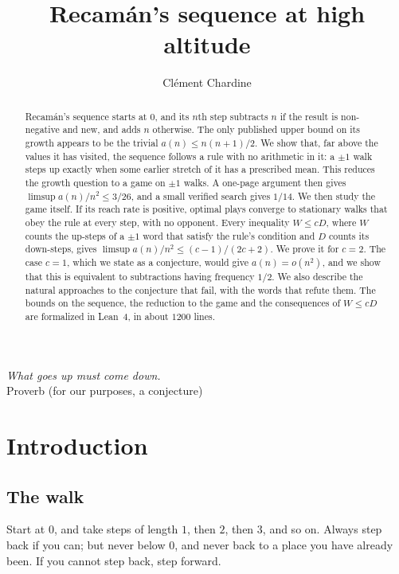 \documentclass[11pt]{amsart}
\title{Recam\'an's sequence at high altitude}
\author{Cl\'ement Chardine}
\theoremstyle{definition}
\begin{document}
\begin{abstract}
Recam\'an's sequence starts at $0$, and its $n$th step subtracts $n$ if the result is non-negative and new, and adds $n$
otherwise. The only published upper bound on its growth appears to be the trivial $a(n)\le n(n+1)/2$. We show that, far above
the values it has visited, the sequence follows a rule with no arithmetic in it: a $\pm1$ walk steps up exactly when some earlier
stretch of it has a prescribed mean. This reduces the growth question to a game on $\pm1$ walks. A one-page argument then gives
$\limsup a(n)/n^2\le3/26$, and a small verified search gives $1/14$. We then study the game itself. If its reach rate is positive,
optimal plays converge to stationary walks that obey the rule at every step, with no opponent. Every inequality $W\le cD$, where $W$
counts the up-steps of a $\pm1$ word that satisfy the rule's condition and $D$ counts its down-steps, gives
$\limsup a(n)/n^2\le(c-1)/(2c+2)$. We prove it for $c=2$. The case $c=1$, which we state as a conjecture, would give
$a(n)=o(n^2)$, and we show that this is equivalent to subtractions having frequency $1/2$. We also describe the natural approaches
to the conjecture that fail, with the words that refute them. The bounds on the sequence, the reduction to the game and the
consequences of $W\le cD$ are formalized in Lean~4, in about $1200$ lines.
\end{abstract}

\maketitle

\begin{flushright}
\small\emph{What goes up must come down.}\\ Proverb (for our purposes, a conjecture)
\end{flushright}

\section{Introduction}

\subsection{The walk}
Start at $0$, and take steps of length $1$, then $2$, then $3$, and so on. Always step back if you can; but never below $0$, and never
back to a place you have already been. If you cannot step back, step forward.
\end{document}
